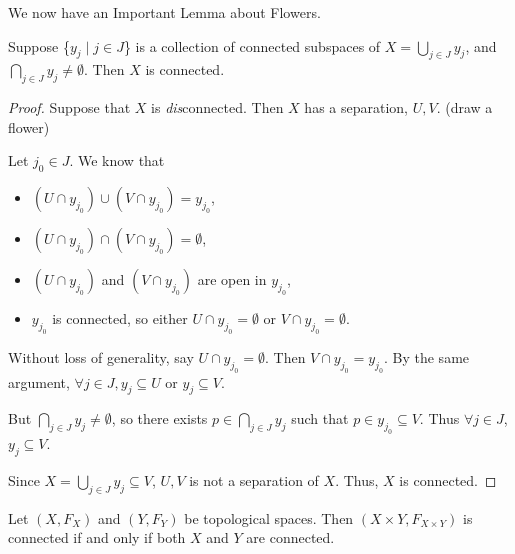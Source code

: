 We now have an Important Lemma about Flowers. 
\begin{lemma}
	Suppose \{$y_j \mid j \in J$\} is a collection of connected subspaces of $X = \displaystyle{\bigcup_{j \in J} y_j}$, and $\displaystyle{\bigcap_{j \in J} y_j} \neq \emptyset$. Then $X$ is connected. 
\end{lemma}
\begin{proof}
	Suppose that $X$ is \textit{dis}connected. Then $X$ has a separation, $U, V$. \placeholder (draw a flower)
	
	Let $j_0 \in J$. We know that 
	\begin{itemize}
		\item $(U\cap y_{j_0}) \cup (V\cap y_{j_0}) = y_{j_0}$, 
		\item $(U\cap y_{j_0}) \cap (V\cap y_{j_0}) = \emptyset$, 
		\item $(U\cap y_{j_0})$ and $(V\cap y_{j_0})$ are open in $y_{j_0}$, 
		\item $y_{j_0}$ is connected, so either $U \cap y_{j_0} = \emptyset$ or $V \cap y_{j_0} = \emptyset$. 
	\end{itemize}
	Without loss of generality, say $U \cap y_{j_0} = \emptyset$. Then $V \cap y_{j_0} = y_{j_0}$. By the same argument, $\forall j\in J, y_j \subseteq U$ or $y_j \subseteq V$.
	
	But $\displaystyle{\bigcap_{j \in J} y_j} \neq \emptyset$, so there exists $p\in \displaystyle{\bigcap_{j \in J} y_j}$ such that $p\in y_{j_0} \subseteq V$. Thus $\forall j\in J$, $y_j \subseteq V$.
	
	Since $X = \displaystyle{\bigcup_{j \in J} y_j} \subseteq V$, $U, V$ is not a separation of $X$. Thus, $X$ is connected. 
\end{proof}
\begin{theorem}
	Let $(X, F_X)$ and $(Y, F_Y)$ be topological spaces. Then $(X\times Y, F_{X\times Y})$ is connected if and only if both $X$ and $Y$ are connected. 
\end{theorem}
